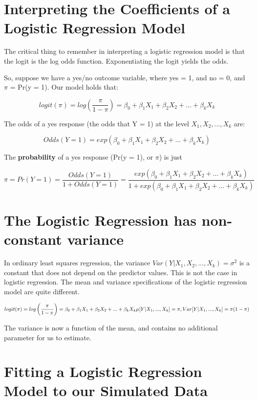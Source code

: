 \documentclass[]{book}
\theoremstyle{definition}
\theoremstyle{definition}
\theoremstyle{definition}
\theoremstyle{remark}
\begin{document}
\section{Interpreting the Coefficients of a Logistic Regression
Model}\label{interpreting-the-coefficients-of-a-logistic-regression-model}

The critical thing to remember in interpreting a logistic regression
model is that the logit is the log odds function. Exponentiating the
logit yields the odds.

So, suppose we have a yes/no outcome variable, where yes = 1, and no =
0, and \(\pi\) = Pr(y = 1). Our model holds that:

\[
logit(\pi) = log\left( \frac{\pi}{1 - \pi} \right) = \beta_0 + \beta_1 X_1 + \beta_2 X_2 + ... + \beta_k X_k
\]

The odds of a yes response (the odds that Y = 1) at the level
\(X_1, X_2, ..., X_k\) are:

\[
Odds(Y = 1) = exp(\beta_0 + \beta_1 X_1 + \beta_2 X_2 + ... + \beta_k X_k)
\]

The \textbf{probability} of a yes response (Pr(y = 1), or \(\pi\)) is
just

\[
\pi = Pr(Y = 1) = \frac{Odds(Y = 1)}{1 + Odds(Y = 1)} = \frac{exp(\beta_0 + \beta_1 X_1 + \beta_2 X_2 + ... + \beta_k X_k)}{1 + exp(\beta_0 + \beta_1 X_1 + \beta_2 X_2 + ... + \beta_k X_k)}
\]

\section{The Logistic Regression has non-constant
variance}\label{the-logistic-regression-has-non-constant-variance}

In ordinary least squares regression, the variance
\(Var(Y | X_1, X_2, ..., X_k) = \sigma^2\) is a constant that does not
depend on the predictor values. This is not the case in logistic
regression. The mean and variance specifications of the logistic
regression model are quite different.

\[
logit(\pi) = log\left( \frac{\pi}{1 - \pi} \right) = \beta_0 + \beta_1 X_1 + \beta_2 X_2 + ... + \beta_k X_k \\
\mu[Y | X_1, ..., X_k] = \pi, \\
Var[Y | X_1, ..., X_k] = \pi(1 - \pi)
\]

The variance is now a function of the mean, and contains no additional
parameter for us to estimate.

\section{Fitting a Logistic Regression Model to our Simulated
Data}\label{fitting-a-logistic-regression-model-to-our-simulated-data}
\end{document}
